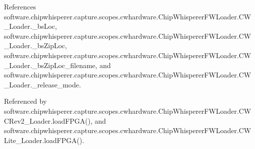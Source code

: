 References software.\+chipwhisperer.\+capture.\+scopes.\+cwhardware.\+Chip\+Whisperer\+F\+W\+Loader.\+C\+W\+\_\+\+Loader.\+\_\+bs\+Loc, software.\+chipwhisperer.\+capture.\+scopes.\+cwhardware.\+Chip\+Whisperer\+F\+W\+Loader.\+C\+W\+\_\+\+Loader.\+\_\+bs\+Zip\+Loc, software.\+chipwhisperer.\+capture.\+scopes.\+cwhardware.\+Chip\+Whisperer\+F\+W\+Loader.\+C\+W\+\_\+\+Loader.\+\_\+bs\+Zip\+Loc\+\_\+filename, and software.\+chipwhisperer.\+capture.\+scopes.\+cwhardware.\+Chip\+Whisperer\+F\+W\+Loader.\+C\+W\+\_\+\+Loader.\+\_\+release\+\_\+mode.



Referenced by software.\+chipwhisperer.\+capture.\+scopes.\+cwhardware.\+Chip\+Whisperer\+F\+W\+Loader.\+C\+W\+C\+Rev2\+\_\+\+Loader.\+load\+F\+P\+G\+A(), and software.\+chipwhisperer.\+capture.\+scopes.\+cwhardware.\+Chip\+Whisperer\+F\+W\+Loader.\+C\+W\+Lite\+\_\+\+Loader.\+load\+F\+P\+G\+A().


